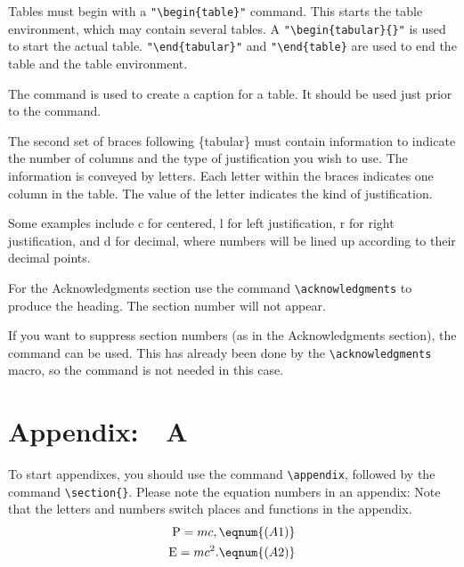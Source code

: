 Tables must begin with a \verb+"\begin{table}"+ command.
This starts the table environment, which may contain several
tables. A \verb+"\begin{tabular}{}"+ is used to start the actual table.
\verb+"\end{tabular}"+ and \verb+"\end{table}+ are used to
end the table and the table environment.

The command  is used to create a caption
for a table. It should be used just prior to the 
command.

The second set of braces following \{tabular\} must contain
information to indicate the number of columns and the type of justification
you wish to use.  The information is conveyed by letters. Each letter
within the braces indicates one column in the table.  The value of the
letter indicates the kind of justification.

Some examples include c for centered, l for left justification,
r for right justification, and d for decimal, where numbers will
be lined up according to their decimal points.

\acknowledgments

 For the Acknowledgments section  use the command
\verb+\acknowledgments+ to produce the heading.  The section number
will not appear.

If you want to suppress section numbers (as in the Acknowledgments
section), the command  can be used. This has already
been done by the
\verb+\acknowledgments+ macro, so the  command is not
needed in this case.


\section*{Appendix: $\,\,$ A}

To start appendixes, you should use the command
\verb+\appendix+, followed by the command \verb+\section{}+.
Please note the equation numbers in an appendix:  Note that the
letters and numbers switch places and functions in the appendix.
\begin{eqnarray}
{\rm P} = mc, \eqnum{(A1)} \\
{\rm E} = mc^2.  \eqnum{(A2)}
\end{eqnarray}


